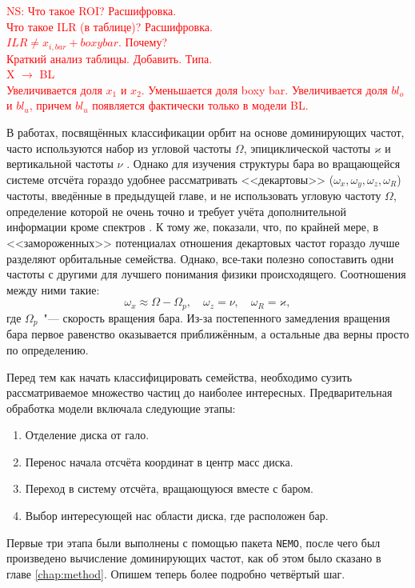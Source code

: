 \documentclass[tikz]{trlnotes}
\begin{document}
\textcolor{red}{NS: Что такое ROI? Расшифровка.\\
Что такое ILR (в таблице)? Расшифровка.\\
$ILR \neq x_{i,bar}+boxy bar$. Почему? \\
Краткий анализ таблицы. Добавить. Типа. \\ 
X $\to$ BL \\
Увеличивается доля $x_1$ и $x_2$. Уменьшается доля boxy bar. Увеличивается доля $bl_o$ и $bl_u$, причем $bl_u$ появляется фактически только в модели BL.
}

В работах, посвящённых классификации орбит на основе доминирующих частот, часто используются набор из угловой
частоты $Ω$, эпициклической частоты $ϰ$ и вертикальной частоты $ν$
\citep{athanassoula2002a,ceverino2007,voglis2007}. Однако для изучения структуры бара во вращающейся системе
отсчёта гораздо удобнее рассматривать <<декартовы>> ($ω_x, ω_y, ω_z, ω_R$) частоты, введённые в предыдущей главе, и не использовать угловую частоту $Ω$, определение которой не очень точно и требует учёта дополнительной информации кроме спектров
\citep{athanassoula2002,gajda2016}. К тому же, \citet{valluri2016} показали, что, по крайней мере, в <<замороженных>> потенциалах отношения декартовых частот
гораздо лучше разделяют орбитальные семейства. 
Однако, все-таки полезно сопоставить одни частоты с другими для лучшего понимания физики происходящего. Соотношения между ними такие: 
\[
  ω_x \approx Ω - Ω_p, \quad ω_z = ν, \quad ω_R = ϰ,
\]
где $Ω_p$~"--- скорость вращения бара. Из-за постепенного замедления вращения бара первое равенство
оказывается приближённым, а остальные два верны просто по определению.

Перед тем как начать классифицировать семейства, необходимо сузить рассматриваемое множество частиц до наиболее
интересных. Предварительная обработка модели включала следующие этапы:
\begin{enumerate}
  \item Отделение диска от гало. 
  \item Перенос начала отсчёта координат в центр масс диска.
  \item Переход в систему отсчёта, вращающуюся вместе с баром.
  \item Выбор интересующей нас области диска, где расположен бар.
\end{enumerate}
Первые три этапа были выполнены с помощью пакета \texttt{NEMO}, после чего был произведено вычисление доминирующих частот, как об этом было сказано в главе \ref{chap:method}. Опишем теперь более подробно четвёртый шаг.
\end{document}
